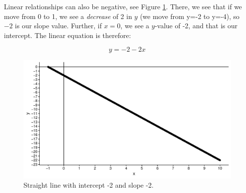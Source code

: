 \documentclass[]{book}\usepackage[]{graphicx}\usepackage[]{color}
\makeatletter
\def\maxwidth{ %
  \ifdim\Gin@nat@width>\linewidth
    \linewidth
  \else
    \Gin@nat@width
  \fi
}
\newenvironment{knitrout}{}{} %
\makeatother
\begin{document}
Linear relationships can also be negative, see Figure \ref{fig:lm_3}. There, we see that if we move from 0 to 1, we see a \textit{decrease} of 2 in $y$ (we move from y=-2 to y=-4), so $-2$ is our slope value. Further, if $x=0$, we see a $y$-value of -2, and that is our intercept. The linear equation is therefore:

\begin{equation}
y = -2 - 2 x
\end{equation}


\begin{knitrout}
\color{fgcolor}\begin{figure}

{\centering \includegraphics[width=\maxwidth]{figure/lm_3-1} 

}

\caption[Straight line with intercept -2 and slope -2]{Straight line with intercept -2 and slope -2.}\label{fig:lm_3}
\end{figure}


\end{knitrout}
\end{document}
